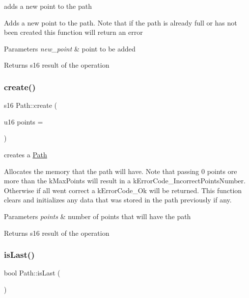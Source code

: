 adds a new point to the path 

Adds a new point to the path. Note that if the path is already full or has not been created this function will return an error


\begin{DoxyParams}{Parameters}
{\em new\+\_\+point} & point to be added \\
\hline
\end{DoxyParams}
\begin{DoxyReturn}{Returns}
s16 result of the operation 
\end{DoxyReturn}
\mbox{\label{class_path_a04a6c286852f3b7f53a187e25b38f3ec}} 
\subsubsection{\texorpdfstring{create()}{create()}}
{\footnotesize\ttfamily s16 Path\+::create (\begin{DoxyParamCaption}\item[{u16}]{points = {} }\end{DoxyParamCaption})}



creates a \mbox{\hyperlink{class_path}{Path}} 

Allocates the memory that the path will have. Note that passing 0 points ore more than the k\+Max\+Points will result in a k\+Error\+Code\+\_\+\+Incorrect\+Points\+Number. Otherwise if all went correct a k\+Error\+Code\+\_\+\+Ok will be returned. This function clears and initializes any data that was stored in the path previously if any.


\begin{DoxyParams}{Parameters}
{\em points} & number of points that will have the path \\
\hline
\end{DoxyParams}
\begin{DoxyReturn}{Returns}
s16 result of the operation 
\end{DoxyReturn}
\mbox{\label{class_path_aeb7e40ba58a329fb01053f72ef0a6d56}} 
\subsubsection{\texorpdfstring{is\+Last()}{isLast()}}
{\footnotesize\ttfamily bool Path\+::is\+Last (\begin{DoxyParamCaption}{ }\end{DoxyParamCaption})}



